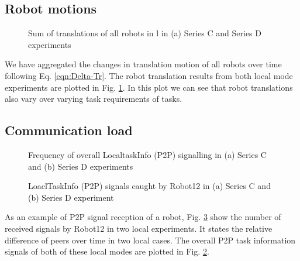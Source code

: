 \subsection*{Robot motions}
\begin{figure}
\centering
{}
\caption{\small Sum of translations of all robots in l in (a) Series C and Series D experiments }
\label{fig:translation-SC-SD} 
\end{figure}
We have aggregated the changes in translation motion of all robots over time following Eq. \ref{eqn:Delta-Tr}. The robot translation results from both local mode experiments are plotted in Fig. \ref{fig:translation-SC-SD}. In this plot we can see that robot translations also vary over varying task requirements of tasks. 
\subsection*{Communication load}
\begin{figure}
\centering
{}
\caption{\small Frequency of overall LocaltaskInfo (P2P) signalling in (a) Series C and (b) Series D experiments}
\label{fig:local-signal-frequency-stat} %
\end{figure}
%
\begin{figure}
\centering
{}
\caption{\small LoaclTaskInfo (P2P) signals caught by Robot12 in (a) Series C and (b) Series D experiment}
\label{fig:local-single-robot-signal} 
\end{figure}
As an example of P2P signal reception of a robot,  Fig. \ref{fig:local-single-robot-signal} show the number of received signals by Robot12 in two local experiments. It states the relative difference of peers over time in two local cases. The overall P2P task information signals of both of these local modes are plotted in Fig. \ref{fig:local-signal-frequency-stat}. 
